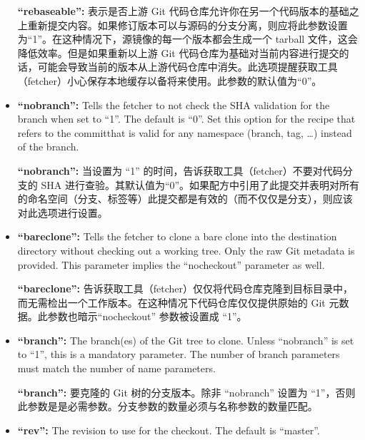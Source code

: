 \begin{itemize}
\medskip
\textbf{``rebaseable'':} 表示是否上游 Git 代码仓库允许你在另一个代码版本的基础之上重新提交内容\footnotemark[1]。如果修订版本可以与源码的分支分离，则应将此参数设置为“1”。在这种情况下，源镜像的每一个版本都会生成一个 tarball 文件，这会降低效率。但是如果重新以上游 Git 代码仓库为基础对当前内容进行提交的话，可能会导致当前的版本从上游代码仓库中消失。此选项提醒获取工具（fetcher）小心保存本地缓存以备将来使用。此参数的默认值为“0”。

\item \textbf{``nobranch'':} Tells the fetcher to not check the SHA validation for the branch when set to ``1''. The default is ``0''. Set this option for the recipe that refers to the commit\footnotemark[2] that is valid for any namespace (branch, tag, …) instead of the branch.

\medskip
\textbf{``nobranch'':} 当设置为 ``1'' 的时间，告诉获取工具（fetcher）不要对代码分支的 SHA 进行查验。其默认值为“0”。如果配方中引用了此提交\footnotemark[2]并表明对所有的命名空间（分支、标签等）此提交都是有效的（而不仅仅是分支），则应该对此选项进行设置。


\item \textbf{``bareclone'':} Tells the fetcher to clone a bare clone into the destination directory without checking out a working tree. Only the raw Git metadata is provided. This parameter implies the ``nocheckout'' parameter as well.

\medskip
\textbf{``bareclone'':} 告诉获取工具（fetcher）仅仅将代码仓库克隆到目标目录中，而无需检出一个工作版本。在这种情况下代码仓库仅仅提供原始的 Git 元数据。此参数也暗示``nocheckout'' 参数被设置成 ``1''。

\item \textbf{``branch'':} The branch(es) of the Git tree to clone. Unless ``nobranch'' is set to ``1'', this is a mandatory parameter. The number of branch parameters must match the number of name parameters.

\medskip
\textbf{``branch'':} 要克隆的 Git 树的分支版本。除非 ``nobranch'' 设置为 ``1''，否则此参数是是必需参数。分支参数的数量必须与名称参数的数量匹配。

\item \textbf{``rev'':} The revision to use for the checkout. The default is ``master''.


\end{itemize}
